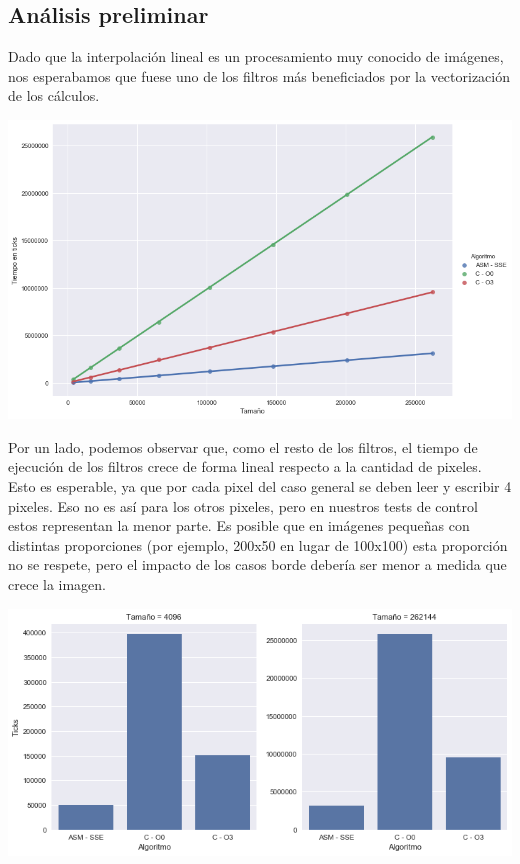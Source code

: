 \subsection{Análisis preliminar}

Dado que la interpolación lineal es un procesamiento muy conocido de imágenes, nos esperabamos que fuese uno de los filtros más beneficiados por la vectorización de los cálculos.

\begin{center}
  \includegraphics[scale=0.5]{img/linearZoom_CvsASMvsO3.png}
\end{center}

Por un lado, podemos observar que, como el resto de los filtros, el tiempo de ejecución de los filtros crece de forma lineal respecto a la cantidad de pixeles. Esto es esperable, ya que por cada pixel del caso general se deben leer y escribir 4 pixeles. Eso no es así para los otros pixeles, pero en nuestros tests de control estos representan la menor parte. Es posible que en imágenes pequeñas con distintas proporciones (por ejemplo, 200x50 en lugar de 100x100) esta proporción no se respete, pero el impacto de los casos borde debería ser menor a medida que crece la imagen.

\begin{center}
  \includegraphics[scale=0.5]{img/linearZoom_CvsASMvsO3_bars.png}
\end{center}

